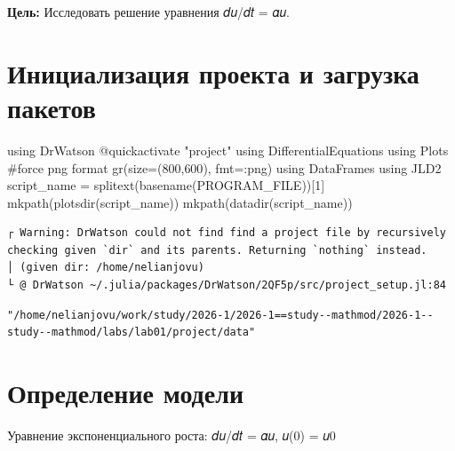 \documentclass[
  12pt,
  a4paper,
  DIV=11,
  numbers=noendperiod]{scrreprt}
\newenvironment{Shaded}{\begin{snugshade}}{\end{snugshade}}
\newcommand{\BuiltInTok}[1]{\textcolor[rgb]{0.00,0.23,0.31}{#1}}
\newcommand{\CommentTok}[1]{\textcolor[rgb]{0.37,0.37,0.37}{#1}}
\newcommand{\ConstantTok}[1]{\textcolor[rgb]{0.56,0.35,0.01}{#1}}
\newcommand{\FloatTok}[1]{\textcolor[rgb]{0.68,0.00,0.00}{#1}}
\newcommand{\FunctionTok}[1]{\textcolor[rgb]{0.28,0.35,0.67}{#1}}
\newcommand{\ImportTok}[1]{\textcolor[rgb]{0.00,0.46,0.62}{#1}}
\newcommand{\NormalTok}[1]{\textcolor[rgb]{0.00,0.23,0.31}{#1}}
\newcommand{\OperatorTok}[1]{\textcolor[rgb]{0.37,0.37,0.37}{#1}}
\newcommand{\PreprocessorTok}[1]{\textcolor[rgb]{0.68,0.00,0.00}{#1}}
\newcommand{\StringTok}[1]{\textcolor[rgb]{0.13,0.47,0.30}{#1}}
\begin{document}
\textbf{Цель:} Исследовать решение уравнения 𝑑𝑢/𝑑𝑡 = 𝛼𝑢.

\section{Инициализация проекта и загрузка
пакетов}\label{ux438ux43dux438ux446ux438ux430ux43bux438ux437ux430ux446ux438ux44f-ux43fux440ux43eux435ux43aux442ux430-ux438-ux437ux430ux433ux440ux443ux437ux43aux430-ux43fux430ux43aux435ux442ux43eux432}

\begin{Shaded}
\begin{Highlighting}[]
\ImportTok{using} \BuiltInTok{DrWatson}
\PreprocessorTok{@quickactivate} \StringTok{"project"}
\ImportTok{using} \BuiltInTok{DifferentialEquations}
\ImportTok{using} \BuiltInTok{Plots}
\CommentTok{\#force png format}
\FunctionTok{gr}\NormalTok{(size}\OperatorTok{=}\NormalTok{(}\FloatTok{800}\NormalTok{,}\FloatTok{600}\NormalTok{), fmt}\OperatorTok{=:}\NormalTok{png)}
\ImportTok{using} \BuiltInTok{DataFrames}
\ImportTok{using} \BuiltInTok{JLD2}
\NormalTok{script\_name }\OperatorTok{=} \FunctionTok{splitext}\NormalTok{(}\FunctionTok{basename}\NormalTok{(}\ConstantTok{PROGRAM\_FILE}\NormalTok{))[}\FloatTok{1}\NormalTok{]}
\FunctionTok{mkpath}\NormalTok{(}\FunctionTok{plotsdir}\NormalTok{(script\_name))}
\FunctionTok{mkpath}\NormalTok{(}\FunctionTok{datadir}\NormalTok{(script\_name))}
\end{Highlighting}
\end{Shaded}

\begin{verbatim}
┌ Warning: DrWatson could not find find a project file by recursively checking given `dir` and its parents. Returning `nothing` instead.
│ (given dir: /home/nelianjovu)
└ @ DrWatson ~/.julia/packages/DrWatson/2QF5p/src/project_setup.jl:84
\end{verbatim}

\begin{verbatim}
"/home/nelianjovu/work/study/2026-1/2026-1==study--mathmod/2026-1--study--mathmod/labs/lab01/project/data"
\end{verbatim}

\section{Определение
модели}\label{ux43eux43fux440ux435ux434ux435ux43bux435ux43dux438ux435-ux43cux43eux434ux435ux43bux438}

Уравнение экспоненциального роста: 𝑑𝑢/𝑑𝑡 = 𝛼𝑢, 𝑢(0) = 𝑢0
\end{document}
